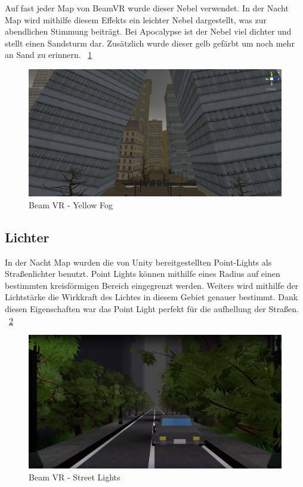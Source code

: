 Auf fast jeder Map von BeamVR wurde dieser Nebel verwendet.
In der Nacht Map wird mithilfe diesem Effekts ein leichter Nebel dargestellt, was zur abendlichen Stimmung beitr\"agt.
Bei Apocalypse ist der Nebel viel dichter und stellt einen Sandsturm dar. Zus\"atzlich wurde dieser gelb gef\"arbt um noch mehr an Sand zu erinnern.
~\ref{fig:beamvr_yellow_fog}
\begin {figure}
    \centering
    \includegraphics[scale=0.3]{pics/beamvr_yellow_fog}
    \caption{Beam VR - Yellow Fog}
    \label{fig:beamvr_yellow_fog}
\end {figure}

\subsection{Lichter}\label{subsec:light-effect}
In der Nacht Map wurden die von Unity bereitgestellten Point-Lights als Straßenlichter benutzt.
Point Lights k\"onnen mithilfe eines Radius auf einen bestimmten kreisf\"ormigen Bereich eingegrenzt werden.
Weiters wird mithilfe der Lichtst\"arke die Wirkkraft des Lichtes in diesem Gebiet genauer bestimmt.
Dank diesen Eigenschaften war das Point Light perfekt f\"ur die aufhellung der Straßen.
~\ref{fig:beamvr_street_lights}
~\cite{Unity_PointLights_2022}
\begin {figure}
    \centering
    \includegraphics[scale=0.3]{pics/beamvr_point_lights}
    \caption{Beam VR - Street Lights}
    \label{fig:beamvr_street_lights}
\end {figure}


